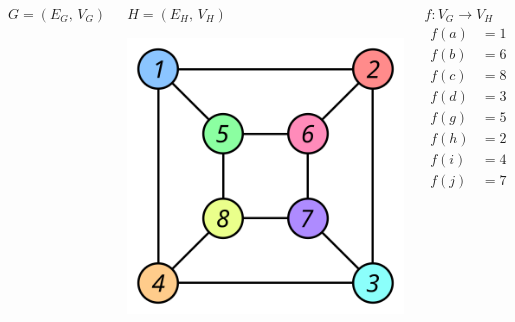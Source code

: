 \documentclass{beamer}
\begin{document}
\begin{frame}
\begin{columns}[t]
\begin{block}{$G=(E_G,\,V_G)$}
\begin{minipage}[t][0.45\textheight][c]{\textwidth}
      \end{minipage}
    \end{block}
    \begin{block}{$H=(E_H,\,V_H)$}
      \begin{minipage}[t][0.45\textheight][c]{\textwidth}
        \includegraphics[scale=0.4]{Graph_isomorphism_b}
      \end{minipage}
    \end{block}
    \abovedisplayskip=0pt
    \abovedisplayshortskip=0pt
    \begin{block}{$f: V_G\rightarrow V_H$}
      \begin{align*}
        f(a) &= 1 \\
        f(b) &= 6 \\
        f(c) &= 8 \\
        f(d) &= 3 \\
        f(g) &= 5 \\
        f(h) &= 2 \\
        f(i) &= 4 \\
        f(j) &= 7
      \end{align*}
    \end{block}
  \end{columns}
\end{frame}
\end{document}
